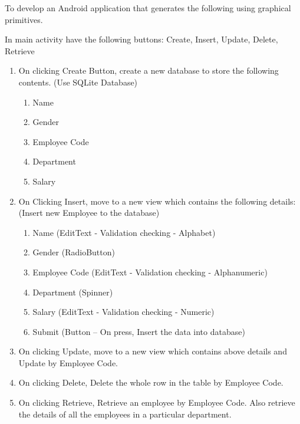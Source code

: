 \documentclass[12pt, a4]{article}
\begin{document}
\begin{flushleft}
To develop an Android application that generates the following using graphical primitives.

In main activity have the following buttons:
Create, Insert, Update, Delete, Retrieve

\begin{enumerate}
\item On clicking Create Button, create a new database to store the following contents. (Use SQLite Database)
\begin{enumerate}
\item Name
\item Gender
\item Employee Code
\item Department
\item Salary
\end{enumerate}

\newpage

\item On Clicking Insert, move to a new view which contains the following details: (Insert new Employee to the database)
\begin{enumerate}
\item Name			(EditText - Validation checking - Alphabet)
\item Gender		(RadioButton)
\item Employee Code	(EditText - Validation checking - Alphanumeric)
\item Department	(Spinner)
\item Salary		(EditText - Validation checking - Numeric)
\item Submit		(Button – On press, Insert the data into database)
\end{enumerate}

\item On clicking Update, move to a new view which contains above details and Update by Employee Code.
\item On clicking Delete, Delete the whole row in the table by Employee Code.
\item On clicking Retrieve, Retrieve an employee by Employee Code. Also retrieve the details of all the employees in a particular department.

\end{enumerate}


\end{flushleft}

\newpage
\subsection*{}
\begin{flushleft}

\end{flushleft}
\end{document}
